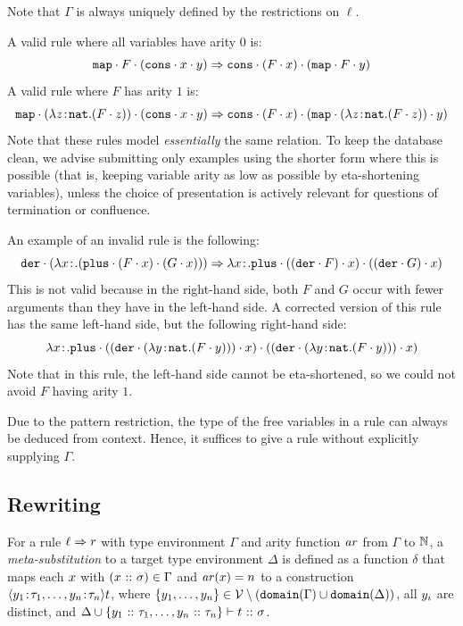 Note that $\Gamma$ is always uniquely defined by the restrictions on $\ell$.

\begin{example}
A valid rule where all variables have arity $0$ is:
\[
\mathtt{map} \cdot F \cdot (\mathtt{cons} \cdot x \cdot y) \Rightarrow
\mathtt{cons} \cdot (F \cdot x) \cdot (\mathtt{map} \cdot F \cdot y)
\]
A valid rule where $F$ has arity $1$ is:
\[
\mathtt{map} \cdot (\lambda z\!:\!\mathtt{nat}.(F \cdot z)) \cdot (\mathtt{cons} \cdot x \cdot y) \Rightarrow
\mathtt{cons} \cdot (F \cdot x) \cdot (\mathtt{map} \cdot (\lambda z\!:\!\mathtt{nat}.(F \cdot z)) \cdot y)
\]
Note that these rules model \emph{essentially} the same relation.  To keep the database clean, we
advise submitting only examples using the shorter form where this is possible (that is, keeping
variable arity as low as possible by eta-shortening variables), unless the choice of presentation
is actively relevant for questions of termination or confluence.

An example of an invalid rule is the following:
\[
\app{\symb{der}}{(\abs{\avar}{\real}{(\app{\app{\symb{plus}}{(\app{F}{\avar})}}{(\app{G}{\avar})})})}
\arrz
\abs{\avar}{\real}{\app{\app{\symb{plus}}{(\app{(\app{\symb{der}}{F})}{\avar})}}{(\app{(\app{\symb{der}}{G})}{\avar})}}
\]
This is not valid because in the right-hand side, both $F$ and $G$ occur with fewer arguments than
they have in the left-hand side.  A corrected version of this rule has the same left-hand side, but
the following right-hand side:
\[
\abs{\avar}{\real}{\app{\app{\symb{plus}}{
    (\app{(\app{\symb{der}}{(\abs{\bvar}{\nat}{(\app{F}{\bvar})})})}{\avar})
  }}{
    (\app{(\app{\symb{der}}{(\abs{\bvar}{\nat}{(\app{F}{\bvar})})})}{\avar})
  }}
\]
Note that in this rule, the left-hand side cannot be eta-shortened, so we could not avoid $F$ having
arity $1$.
\end{example}

Due to the pattern restriction, the type of the free variables in a rule can always be deduced from
context.  Hence, it suffices to give a rule without explicitly supplying $\Gamma$.

\subsection{Rewriting}

For a rule $\ell \Rightarrow r$ with type environment $\Gamma$ and arity function $\mathit{ar}$ from $\Gamma$
to $\mathbb{N}$, a \emph{meta-substitution} to a target type environment $\Delta$ is defined as a function
$\delta$ that maps each $x$ with $(x \ \mathtt{::}\  \sigma) \in \Gamma$ and $\mathit{ar}(x) = n$ to
a construction $\langle y_1\!:\!\tau_1,\dots,y_n\!:\!\tau_{n}\rangle t$, where
$\{y_1,\dots,y_n\} \in \mathcal{V} \setminus (\mathtt{domain}(\Gamma) \cup \mathtt{domain}(\Delta))$,
all $y_i$ are distinct, and $\Delta \cup \{y_1 \ \mathtt{::}\  \tau_1,\dots,y_n
\ \mathtt{::}\ \tau_n\} \vdash t \ \mathtt{::}\  \sigma$.

